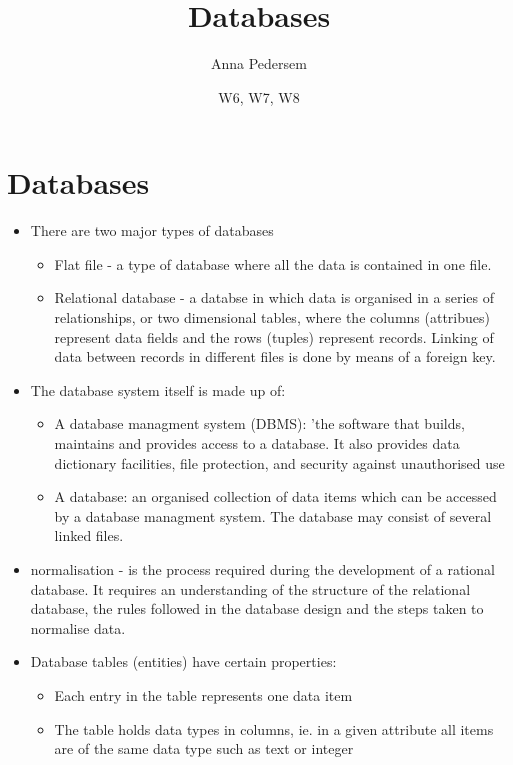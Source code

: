 \documentclass[12pt, a4, twoside]{article}
\title{Databases}
\author{Anna Pedersem}
\date{W6, W7, W8}
\begin{document}
\maketitle

\section{Databases}
\begin{center}
  \begin{itemize}
    \item There are two major types of databases
    \begin{itemize}
      \item Flat file - a type of database where all the data is contained in one file. 
      \item Relational database - a databse in which data is organised in a series of relationships, or two dimensional tables, where the columns (attribues) represent data fields and the rows (tuples) represent records. Linking of data between records in different files is done by means of a foreign key. 
    \end{itemize}
    \item The database system itself is made up of: 
    \begin{itemize}
      \item A database managment system (DBMS): 'the software that builds, maintains and provides access to a database. It also provides data dictionary facilities, file protection, and security against unauthorised use
      \item A database: an organised collection of data items which can be accessed by a database managment system. The database may consist of several linked files. 
    \end{itemize}
    \item normalisation - is the process required during the development of a rational database. It requires an understanding of the structure of the relational database, the rules followed in the database design and the steps taken to normalise data. 
    \item Database tables (entities) have certain properties:
    \begin{itemize}
      \item Each entry in the table represents one data item 
      \item The table holds data types in columns, ie. in a given attribute  all items are of the same data type such as text or integer 

\end{itemize}
\end{itemize}
\end{center}
\end{document}
